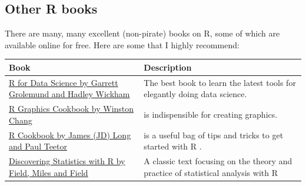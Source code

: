 \documentclass[
]{book}
\begin{document}
\hypertarget{other-r-books}{%
\subsection{Other R books}\label{other-r-books}}

There are many, many excellent (non-pirate) books on R, some of which are available online for free. Here are some that I highly recommend:

\begin{longtable}[]{@{}ll@{}}
\toprule
\begin{minipage}[b]{0.42\columnwidth}\raggedright
Book\strut
\end{minipage} & \begin{minipage}[b]{0.52\columnwidth}\raggedright
Description\strut
\end{minipage}\tabularnewline
\midrule
\endhead
\begin{minipage}[t]{0.42\columnwidth}\raggedright
\href{http://r4ds.had.co.nz/}{R for Data Science by Garrett Grolemund and Hadley Wickham}\strut
\end{minipage} & \begin{minipage}[t]{0.52\columnwidth}\raggedright
The best book to learn the latest tools for elegantly doing data science.\strut
\end{minipage}\tabularnewline
\begin{minipage}[t]{0.42\columnwidth}\raggedright
\href{http://www.cookbook-r.com/Graphs/}{R Graphics Cookbook by Winston Chang}\strut
\end{minipage} & \begin{minipage}[t]{0.52\columnwidth}\raggedright
is indispensible for creating graphics.\strut
\end{minipage}\tabularnewline
\begin{minipage}[t]{0.42\columnwidth}\raggedright
\href{https://rc2e.com/index.html}{R Cookbook by James (JD) Long and Paul Teetor}\strut
\end{minipage} & \begin{minipage}[t]{0.52\columnwidth}\raggedright
is a useful bag of tips and tricks to get started with R .\strut
\end{minipage}\tabularnewline
\begin{minipage}[t]{0.42\columnwidth}\raggedright
\href{https://www.amazon.com/Discovering-Statistics-Using-Andy-Field/dp/1446200469/ref=sr_1_2?ie=UTF8\&qid=1487759316\&sr=8-2\&keywords=statistics+with+r}{Discovering Statistics with R by Field, Miles and Field}\strut
\end{minipage} & \begin{minipage}[t]{0.52\columnwidth}\raggedright
A classic text focusing on the theory and practice of statistical analysis with R\strut
\end{minipage}\tabularnewline
\bottomrule
\end{longtable}
\end{document}
